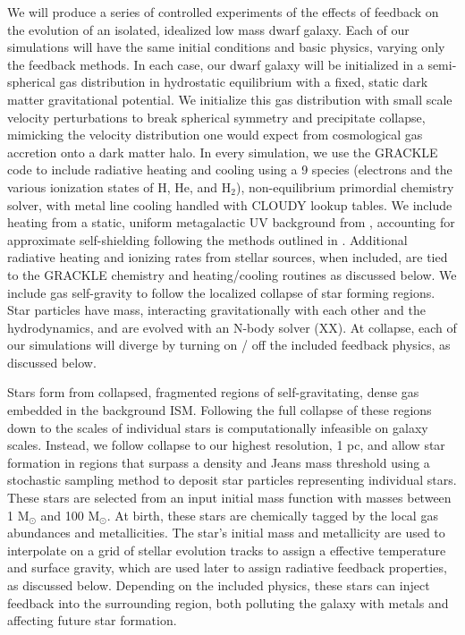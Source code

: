 \documentclass[11pt]{article}
\begin{document}
We will produce a series of controlled experiments of the effects of feedback on the evolution of an isolated, idealized low mass dwarf galaxy. Each of our simulations will have the same initial conditions and basic physics, varying only the feedback methods. In each case, our dwarf galaxy will be initialized in a semi-spherical gas distribution in hydrostatic equilibrium with a fixed, static dark matter gravitational potential. We initialize this gas distribution with small scale velocity perturbations to break spherical symmetry and precipitate collapse, mimicking the velocity distribution one would expect from cosmological gas accretion onto a dark matter halo. In every simulation, we use the \textsc{GRACKLE} code to include radiative heating and cooling using a 9 species (electrons and the various ionization states of H, He, and H$_{2}$), non-equilibrium primordial chemistry solver, with metal line cooling handled with CLOUDY lookup tables. We include heating from a static, uniform metagalactic UV background from \cite{HM2012}, accounting for approximate self-shielding following the methods outlined in \cite{Rahmati2013}. Additional radiative heating and ionizing rates from stellar sources, when included, are tied to the \textsc{GRACKLE} chemistry and heating/cooling routines as discussed below. We include gas self-gravity to follow the localized collapse of star forming regions. Star particles have mass, interacting gravitationally with each other and the hydrodynamics, and are evolved with an N-body solver (XX). At collapse, each of our simulations will diverge by turning on / off the included feedback physics, as discussed below.

Stars form from collapsed, fragmented regions of self-gravitating, dense gas embedded in the background ISM. Following the full collapse of these regions down to the scales of individual stars is computationally infeasible on galaxy scales. Instead, we follow collapse to our highest resolution, 1 pc, and allow star formation in regions that surpass a density and Jeans mass threshold using a stochastic sampling method \citep{Goldbaum2015} to deposit star particles representing individual stars. These stars are selected from an input initial mass function \citep{Salpeter1955} with masses between 1 M$_{\odot}$ and 100 M$_{\odot}$. At birth, these stars are chemically tagged by the local gas abundances and metallicities. The star's initial mass and metallicity are used to interpolate on a grid of stellar evolution tracks \citep{Bressan2012} to assign a effective temperature and surface gravity, which are used later to assign radiative feedback properties, as discussed below. Depending on the included physics, these stars can inject feedback into the surrounding region, both polluting the galaxy with metals and affecting future star formation.
\end{document}
